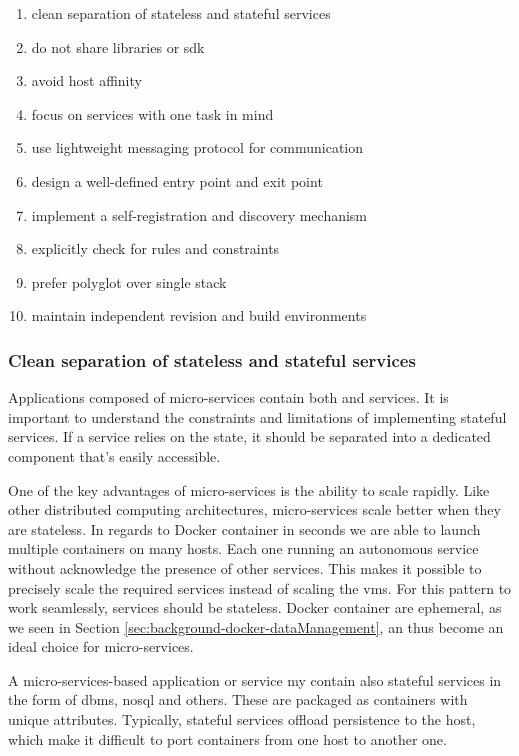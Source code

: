 \begin{enumerate}
	\item{clean separation of stateless and stateful services}
	\item{do not share libraries or \ac{sdk}}
	\item{avoid host affinity}
	\item{focus on services with one task in mind}
	\item{use lightweight messaging protocol for communication}
	\item{design a well-defined entry point and exit point}
	\item{implement a self-registration and discovery mechanism}
	\item{explicitly check for rules and constraints}
	\item{prefer polyglot over single stack}
	\item{maintain independent revision and build environments}
\end{enumerate}

\subsubsection*[Commandment 1]{Clean separation of stateless and stateful services}
\label{sec:architecture-proposal-microservices-commandments-1}
Applications composed of micro-services contain both  and  services.
It is important to understand the constraints and limitations of implementing stateful services. If a
service relies on the state, it should be separated into a dedicated component that's easily accessible.

One of the key advantages of micro-services is the ability to scale rapidly. Like other distributed
computing architectures, micro-services scale better when they are stateless. In regards to Docker
container in seconds we are able to launch multiple containers on many hosts. Each one running an
autonomous service without acknowledge the presence of other services. This makes it possible to
precisely scale the required services instead of scaling the \ac{vm}s. For this pattern to work seamlessly,
services should be stateless. Docker container are ephemeral, as we seen in Section 
\ref{sec:background-docker-dataManagement}, an thus become an ideal choice for micro-services.

A micro-services-based application or service my contain also stateful services in the form of \ac{dbms},
\ac{nosql} and others. These are packaged as containers with unique attributes. Typically, stateful
services offload persistence to the host, which make it difficult to port containers from one host to
another one.


